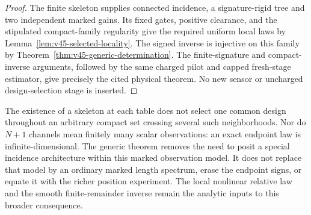 \begin{proof}
The finite skeleton supplies connected incidence, a signature-rigid tree
and two independent marked gains.  Its fixed gates, positive clearance,
and the stipulated compact-family regularity give the required uniform
local laws by Lemma~\ref{lem:v45-selected-locality}.  The signed inverse
is injective on this family by
Theorem~\ref{thm:v45-generic-determination}.  The finite-signature and
compact-inverse arguments, followed by the same charged pilot and capped
fresh-stage estimator, give precisely the cited physical theorem.  No new
sensor or uncharged design-selection stage is inserted.
\end{proof}

The existence of a skeleton at each table does not select one common design
throughout an arbitrary compact set crossing several such neighborhoods.
Nor do $N+1$ channels mean finitely many scalar observations: an exact
endpoint law is infinite-dimensional.  The generic theorem removes the
need to posit a special incidence architecture within this marked
observation model.  It does not replace that model by an ordinary marked
length spectrum, erase the endpoint signs, or equate it with the richer
position experiment.  The local nonlinear relative law and the smooth
finite-remainder inverse remain the analytic inputs to this broader
consequence.
